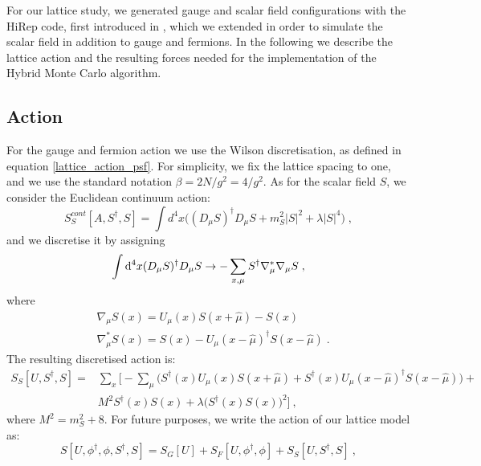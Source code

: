 For our lattice study, we generated gauge and scalar field configurations with the HiRep code, first introduced in \cite{DelDebbio:2008zf}, which we extended in order to simulate the scalar field in addition to gauge and fermions. In the following we describe the lattice action and the resulting forces needed for the implementation of the Hybrid Monte Carlo algorithm.


\subsection{Action}

For the gauge and fermion action we use the Wilson discretisation, as defined in equation \ref{lattice_action_psf}. For simplicity, we fix the lattice spacing to one, and we use the standard notation $\beta = 2 N/ g^2 = 4/g^2$. As for the scalar field $S$, we consider the Euclidean continuum action:
\begin{equation}
S_S^{cont} [A,S^{\dagger},S]= \int d^4x \biggl( (D_{\mu} S)^{\dagger} D_{\mu}S + m_S^2 |S|^ 2 + \lambda |S|^4 \biggr) \; ,
\end{equation}
%
and we discretise it by assigning 
\begin{equation}
\int \mathrm{d}^4x (D_{\mu} S)^{\dagger} D_{\mu}S \to - \sum_{x,\mu} S^{\dagger} \nabla_{\mu}^* \nabla_{\mu} S \; ,
\end{equation}
%
where
\begin{equation}
\begin{split}
&\nabla_{\mu} S(x) = U_{\mu}(x)S(x + \hat\mu) - S(x)  \\
&\nabla_{\mu}^* S(x) = S(x) - U_{\mu}(x- \hat \mu)^{\dagger} S(x- \hat \mu) \; .
\end{split}
\end{equation}
%
The resulting discretised action is: 
\begin{equation}
\begin{split}
S_S[U,S^{\dagger},S] = & \sum_x \biggl[ - \sum_{\mu} \biggl( S^{\dagger}(x) U_{\mu}(x) S(x+\hat\mu) + S^{\dagger}(x) U_{\mu}(x-\hat\mu)^{\dagger} S(x-\hat\mu) \biggr) +  \\
 & M^2 S^{\dagger}(x) S(x) + \lambda \bigl(S^{\dagger}(x) S(x) \bigr)^2 \biggr] \: ,
\end{split}
\label{scalar_lattice_action}
\end{equation}
%
where $M^2=m_S^2+8$. For future purposes, we write the action of our lattice model as:
\begin{equation}
S[U,\phi^{\dagger},\phi,S^{\dagger},S] = S_G[U] + S_F[U,\phi^{\dagger},\phi] + S_S[U,S^{\dagger},S] \: ,
\label{action}
\end{equation}
